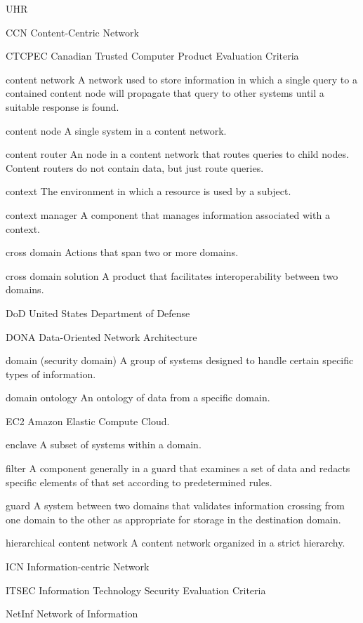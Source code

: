 \documentclass[botnum,fleqn,final]{unmeethesis}
\begin{document}
\begin{glossary}{UHR}
\item[CCN] Content-Centric Network
\item[CTCPEC] Canadian Trusted Computer Product Evaluation Criteria 
\item[content network] A network used to store information in which a single query to a contained content node will propagate that query to other systems until a suitable response is found.
\item[content node] A single system in a content network.
\item[content router] An node in a content network that routes queries to child nodes.  Content routers do not contain data, but just route queries.
\item[context] The environment in which a resource is used by a subject.
\item[context manager] A component that manages information associated with a context.
\item[cross domain] Actions that span two or more domains.
\item[cross domain solution] A product that facilitates interoperability between two domains.
\item[DoD] United States Department of Defense
\item[DONA] Data-Oriented Network Architecture
\item[domain (security domain)] A group of systems designed to handle certain specific types of information.
\item[domain ontology] An ontology of data from a specific domain.
\item[EC2] Amazon Elastic Compute Cloud.
\item[enclave] A subset of systems within a domain.
\item[filter] A component generally in a guard that examines a set of data and redacts specific elements of that set according to predetermined rules.
\item[guard] A system between two domains that validates information crossing from one domain to the other as appropriate for storage in the destination domain.
\item[hierarchical content network] A content network organized in a strict hierarchy.
\item[ICN] Information-centric Network
\item[ITSEC] Information Technology Security Evaluation Criteria
\item[NetInf] Network of Information

\end{glossary}
\end{document}
